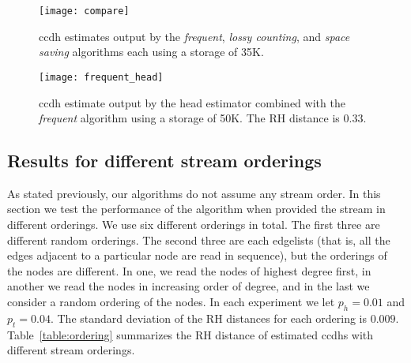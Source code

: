 \documentclass[11pt]{article}
\theoremstyle{definition}
\begin{document}
\begin{figure*}
\centering
  \begin{minipage}[b]{0.5\linewidth}
    \centering
    \texttt{[image: compare]}
    \captionsetup{width=0.9\textwidth}
    \caption{ccdh estimates output by the \emph{frequent}, \emph{lossy counting},
and \emph{space saving} algorithms each using a storage of 35K.\\}
    \label{fig:compare}
\end{minipage}\begin{minipage}[b]{0.5\linewidth}
    \centering
    \texttt{[image: frequent\_head]}
    \captionsetup{width=0.9\textwidth}
    \caption{ccdh estimate output by the head estimator combined with the
\emph{frequent} algorithm using a storage of 50K.  The RH distance
is $0.33$.}
    \label{fig:frequent_head}
\end{minipage}
\end{figure*}












\subsection{Results for different stream orderings}
As stated previously, our algorithms do not assume any stream order.  In this
section we test the performance of the algorithm when provided the stream in
different orderings.  We use six different orderings in total.  The first three
are different random orderings.  The second three are each edgelists (that is,
all the edges adjacent to a particular node are read in sequence), but the
orderings of the nodes are different.  In one, we read the nodes of highest
degree first, in another we read the nodes in increasing order of degree, and in
the last we consider a random ordering of the nodes.  In each experiment we let
$p_h = 0.01$ and $p_t = 0.04$.  The standard deviation of the RH distances for
each ordering is $0.009$.  Table~\ref{table:ordering} summarizes the RH distance
of estimated ccdhs with different stream orderings.
\end{document}
